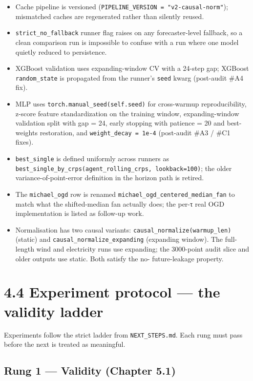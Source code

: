 \documentclass[11pt,a4paper,openany]{report}
\begin{document}
\begin{itemize}
  \item Cache pipeline is versioned (\texttt{PIPELINE\_VERSION = "v2-causal-norm"});
    mismatched caches are regenerated rather than silently reused.
  \item \texttt{strict\_no\_fallback} runner flag raises on any forecaster-level
    fallback, so a clean comparison run is impossible to confuse with a
    run where one model quietly reduced to persistence.
  \item XGBoost validation uses expanding-window CV with a 24-step gap;
    XGBoost \texttt{random\_state} is propagated from the runner's \texttt{seed} kwarg
    (post-audit \#A4 fix).
  \item MLP uses \texttt{torch.manual\_seed(self.seed)} for cross-warmup
    reproducibility, z-score feature standardization on the training
    window, expanding-window validation split with gap = 24, early
    stopping with patience = 20 and best-weights restoration, and
    \texttt{weight\_decay = 1e-4} (post-audit \#A3 / \#C1 fixes).
  \item \texttt{best\_single} is defined uniformly across runners as
    \texttt{best\_single\_by\_crps(agent\_rolling\_crps, lookback=100)}; the older
    variance-of-point-error definition in the horizon path is retired.
  \item The \texttt{michael\_ogd} row is renamed \texttt{michael\_ogd\_centered\_median\_fan}
    to match what the shifted-median fan actually does; the per-τ real
    OGD implementation is listed as follow-up work.
  \item Normalisation has two causal variants: \texttt{causal\_normalize(warmup\_len)}
    (static) and \texttt{causal\_normalize\_expanding} (expanding window). The
    full-length wind and electricity runs use expanding; the 3000-point
    audit slice and older outputs use static. Both satisfy the no-
    future-leakage property.
\end{itemize}

\section{4.4 Experiment protocol — the validity ladder}

Experiments follow the strict ladder from \texttt{NEXT\_STEPS.md}. Each rung
must pass before the next is treated as meaningful.

\subsection{Rung 1 — Validity (Chapter 5.1)}
\end{document}

